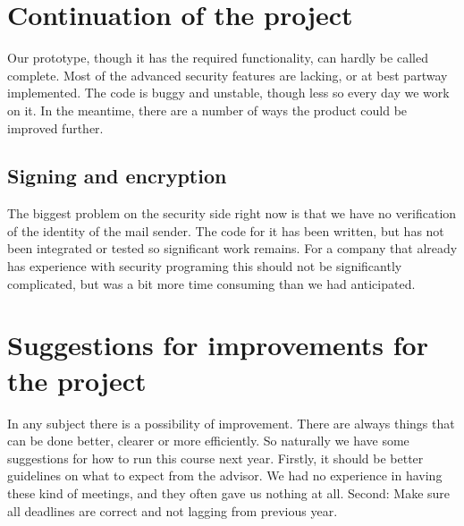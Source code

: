\section{Continuation of the project}
Our prototype, though it has the required functionality, can hardly be called complete. Most of the advanced security features are lacking, or at best partway implemented. The code is buggy and unstable, though less so every day we work on it. In the meantime, there are a number of ways the product could be improved further.
\subsection{Signing and encryption}
The biggest problem on the security side right now is that we have no verification of the identity of the mail sender. The code for it has been written, but has not been integrated or tested so significant work remains. For a company that already has experience with security programing this should not be significantly complicated, but was a bit more time consuming than we had anticipated.


\section{Suggestions for improvements for the project}
In any subject there is a possibility of improvement. There are always things that can be done better, clearer or more efficiently. So naturally we have some suggestions for how to run this course next year.
\newline
\newline
Firstly, it should be better guidelines on what to expect from the advisor. We had no experience in having these kind of meetings, and they often gave us nothing at all.
\newline
\newline
Second: Make sure all deadlines are correct and not lagging from previous year.


